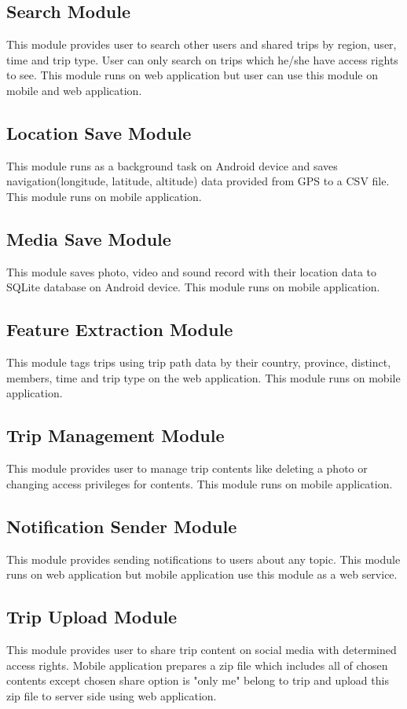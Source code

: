 \subsection{Search Module}
This module provides user to search other users and shared trips by region, user, time and trip type. User can only search on trips which he/she have access rights to see. This module runs on web application but user can use this module on mobile and web application. 
\subsection{Location Save Module}
This module runs as a background task on Android device and saves navigation(longitude, latitude, altitude) data provided from GPS to a CSV file. This module runs on mobile application.
\subsection{Media Save Module}
This module saves photo, video and sound record with their location data to SQLite database on Android device. This module runs on mobile application.
\subsection{Feature Extraction Module}
This module tags trips using trip path data by their country, province, distinct, members, time and trip type on the web application. This module runs on mobile application.
\subsection{Trip Management Module}
This module provides user to manage trip contents like deleting a photo or changing access privileges for contents. This module runs on mobile application.
\subsection{Notification Sender Module}   
This module provides sending notifications to users about any topic. This module runs on web application but mobile application use this module as a web service.
\subsection{Trip Upload Module}
This module provides user to share trip content on social media with determined access rights. Mobile application prepares a zip file which includes all of chosen contents except chosen share option is "only me" belong to trip and upload this zip file to server side using web application.
